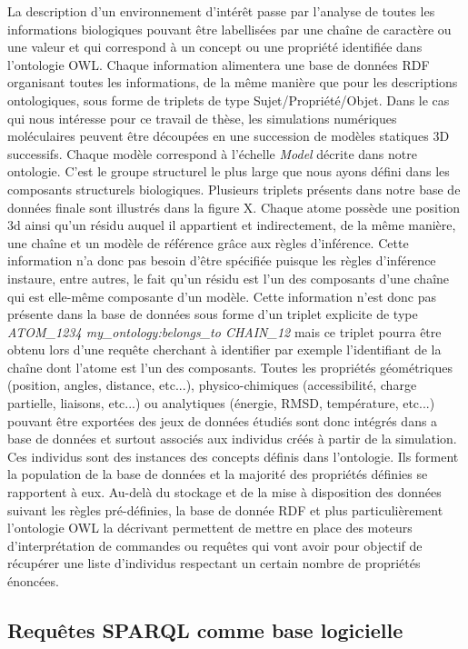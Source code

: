 La description d'un environnement d'intérêt passe par l'analyse de toutes les informations biologiques pouvant être labellisées par une chaîne de caractère ou une valeur et qui correspond à un concept ou une propriété identifiée dans l'ontologie OWL. Chaque information alimentera une base de données RDF organisant toutes les informations, de la même manière que pour les descriptions ontologiques, sous forme de triplets de type Sujet/Propriété/Objet.
Dans le cas qui nous intéresse pour ce travail de thèse, les simulations numériques moléculaires peuvent être découpées en une succession de modèles statiques 3D successifs. Chaque modèle correspond à l'échelle \textit{Model} décrite dans notre ontologie. C'est le groupe structurel le plus large que nous ayons défini dans les composants structurels biologiques. Plusieurs triplets présents dans notre base de données finale sont illustrés dans la figure X. Chaque atome possède une position 3d ainsi qu'un résidu auquel il appartient et indirectement, de la même manière, une chaîne et un modèle de référence grâce aux règles d'inférence. Cette information n'a donc pas besoin d'être spécifiée puisque les règles d'inférence instaure, entre autres, le fait qu'un résidu est l'un des composants d'une chaîne qui est elle-même composante d'un modèle. Cette information n'est donc pas présente dans la base de données sous forme d'un triplet explicite de type \textit{ATOM\_1234 my\_ontology:belongs\_to CHAIN\_12} mais ce triplet pourra être obtenu lors d'une requête cherchant à identifier par exemple l'identifiant de la chaîne dont l'atome est l'un des composants. Toutes les propriétés géométriques (position, angles, distance, etc...), physico-chimiques (accessibilité, charge partielle, liaisons, etc...) ou analytiques (énergie, RMSD, température, etc...) pouvant être exportées des jeux de données étudiés sont donc intégrés dans a base de données et surtout associés aux individus créés à partir de la simulation. Ces individus sont des instances des concepts définis dans l'ontologie. Ils forment la population de la base de données et la majorité des propriétés définies se rapportent à eux.
Au-delà du stockage et de la mise à disposition des données suivant les règles pré-définies, la base de donnée RDF et plus particulièrement l'ontologie OWL la décrivant permettent de mettre en place des moteurs d'interprétation de commandes ou requêtes qui vont avoir pour objectif de récupérer une liste d'individus respectant un certain nombre de propriétés énoncées.

\subsection{Requêtes SPARQL comme base logicielle}

